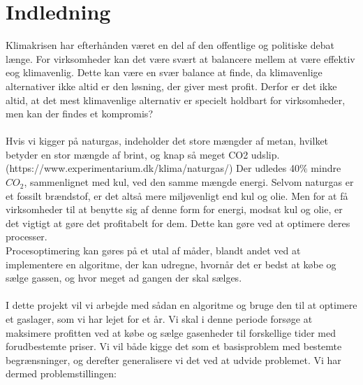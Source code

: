 \chapter{Indledning}
Klimakrisen har efterhånden været en del af den offentlige og politiske debat længe. For virksomheder kan det være svært at balancere mellem at være effektiv eog klimavenlig. Dette kan være en svær balance at finde, da klimavenlige alternativer ikke altid er den løsning, der giver mest profit. Derfor er det ikke altid, at det mest klimavenlige alternativ er specielt holdbart for virksomheder, men kan der findes et kompromis? \\ \\Hvis vi kigger på naturgas, indeholder det store mængder af metan, hvilket betyder en stor mængde af brint, og knap så meget CO2 udslip. (https://www.experimentarium.dk/klima/naturgas/) Der udledes 40$\%$ mindre $CO_{2}$, sammenlignet med kul, ved den samme mængde energi. Selvom naturgas er et fossilt brændstof, er det altså mere miljøvenligt end kul og olie. Men for at få virksomheder til at benytte sig af denne form for energi, modsat kul og olie, er det vigtigt at gøre det profitabelt for dem. Dette kan gøre ved at optimere deres processer. \\ Procesoptimering kan gøres på et utal af måder, blandt andet ved at implementere en algoritme, der kan udregne, hvornår det er bedst at købe og sælge gassen, og hvor meget ad gangen der skal sælges. \\
\\I dette projekt vil vi arbejde med sådan en algoritme og bruge den til at optimere et gaslager, som vi har lejet for et år. Vi skal i denne periode forsøge at maksimere profitten ved at købe og sælge gasenheder til forskellige tider med forudbestemte priser. Vi vil både kigge det som et basisproblem med bestemte begrænsninger, og derefter generalisere vi det ved at udvide problemet. Vi har dermed problemstillingen: 

